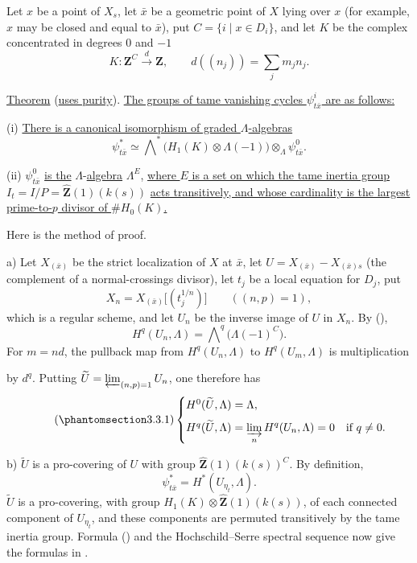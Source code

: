 Let $x$ be a point of $X_s$, let $\bar x$ be a geometric point of $X$
lying over $x$ (for example, $x$ may be closed and equal to $\bar x$),
put $C=\{i\mid x\in D_i\}$, and let $K$ be the complex concentrated in
degrees $0$ and $-1$
\begin{equation*}
K:\mathbf Z^C\xrightarrow{\ d\ }\mathbf Z,
\qquad d((n_j))=\sum_jm_jn_j.
\end{equation*}

\underline{Theorem}  (\underline{uses purity}). \underline{The groups
of tame vanishing cycles $\psi^i_{t\bar x}$ are as follows:}

(i) \underline{There is a canonical isomorphism of graded
$\Lambda$-algebras}
\begin{equation*}
\psi^*_{t\bar x}\simeq
\bigwedge\nolimits^*\bigl(H_1(K)\otimes\Lambda(-1)\bigr)
\otimes_\Lambda\psi^0_{t\bar x}.
\end{equation*}

(ii) $\psi^0_{t\bar x}$ \underline{is the} $\Lambda$-\underline{algebra}
$\Lambda^E$, \underline{where $E$ is a set on which the tame inertia
group} $I_t=I/P=\widehat{\mathbf Z}(1)(k(s))$
\underline{acts transitively, and whose cardinality is the largest
prime-to-$p$ divisor of $\#H_0(K)$.}

Here is the method of proof.

a) Let $X_{(\bar x)}$ be the strict localization of $X$ at $\bar x$,
let $U=X_{(\bar x)}-X_{(\bar x)s}$ (the complement of a
normal-crossings divisor), let $t_j$ be a local equation for $D_j$, put
\[
X_n=X_{(\bar x)}\bigl[(t_j^{1/n})\bigr]
\qquad ((n,p)=1),
\]
which is a regular scheme, and let $U_n$ be the inverse image of $U$ in
$X_n$. By (),
\[
H^q(U_n,\Lambda)=\bigwedge\nolimits^q\bigl(\Lambda(-1)^C\bigr).
\]
For $m=nd$, the pullback map from $H^q(U_n,\Lambda)$ to
$H^q(U_m,\Lambda)$ is multiplication


by $d^q$. Putting
$\widetilde U=\varprojlim_{(n,p)=1}U_n$, one therefore has
\begin{equation}\tag{\SGARefTarget{sga7.sga7i.ei.n3-3-1}{3.3.1}}
\begin{cases}
H^0(\widetilde U,\Lambda)=\Lambda,\\[6pt]
H^q(\widetilde U,\Lambda)=\displaystyle\varinjlim_n
  H^q(U_n,\Lambda)=0 & \text{if }q\ne0.
\end{cases}
\end{equation}

b) $\widetilde U$ is a pro-covering of $U$ with group
$\widehat{\mathbf Z}(1)(k(s))^C$. By definition,
\[
\psi^*_{t\bar x}=H^*(U_{\eta_t},\Lambda).
\]
$\widetilde U$ is a pro-covering, with group
$H_1(K)\otimes\widehat{\mathbf Z}(1)(k(s))$, of each connected component
of $U_{\eta_t}$, and these components are permuted transitively by the
tame inertia group. Formula () and the Hochschild--Serre spectral
sequence now give the formulas in .

